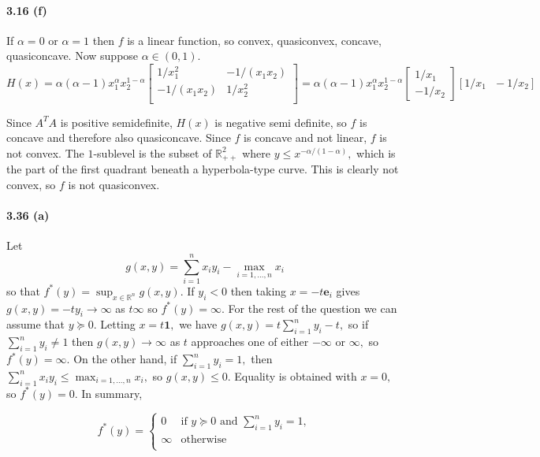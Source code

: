 \documentclass[a4paper,12pt]{article}
\newcommand{\e}{\mathbf{e}}
\begin{document}
\paragraph*{3.16 (f) }
If $\alpha = 0$ or $\alpha = 1$ then $f$ is a linear function, so convex, quasiconvex, concave, quasiconcave. 
\newline
Now suppose $\alpha \in (0,1).$
$$
H(x) = \alpha (\alpha-1) x_1^{\alpha} x_2^{1-\alpha}
\begin{bmatrix}
    1/x_1^2       & -1/(x_1 x_2) \\
    -1/(x_1 x_2)       & 1/x_2^2 \\
\end{bmatrix}
= \alpha (\alpha-1) x_1^{\alpha}  x_2^{1-\alpha}
\begin{bmatrix}1/x_1 \\-1/x_2\end{bmatrix} [ 1/x_1 \ \ \  -1/x_2 ]
$$

Since $A^TA$ is positive semidefinite, $H(x)$ is negative semi definite, so $f$ is concave and therefore also quasiconcave. Since $f$ is concave and not linear, $f$ is not convex. The $1$-sublevel is the subset of $\mathbb{R}^2_{++}$ where $ y \leq x^{-\alpha/(1-\alpha)},$ which is the part of the first quadrant beneath a hyperbola-type curve. This is clearly not convex, so $f$ is not quasiconvex. 

\paragraph*{3.36 (a)}
Let $$g(x,y) = \sum_{i=1}^n x_i y_i - \max_{i=1,\ldots, n} x_{i}$$ so that $f^*(y) = \sup_{x\in \mathbb{R}^n} g(x,y).$
\newline
If $y_i<0$ then taking $x = -t \e_i$ gives $g(x,y) = -t y_i \to\infty$ as $t\infty$ so $f^*(y) = \infty.$ 
\newline
For the rest of the question we can assume that $y \succeq 0.$ Letting $x = t \mathbf{1},$ we have $g(x,y) = t \sum_{i=1}^n y_i - t,$ so if $\sum_{i=1}^n y_i \neq 1$ then $g(x,y) \to \infty$ as $t$ approaches one of either $-\infty$ or $\infty,$ so $f^*(y)  = \infty.$
\newline
On the other hand, if $\sum_{i=1}^n y_i = 1,$ then $\sum_{i=1}^n x_i y_i \leq \max_{i=1,\ldots, n} x_i,$ so $g(x,y) \leq 0.$ Equality is obtained with $x=0,$ so $f^*(y) = 0.$ 
\newline
In summary,


\[
  f^*(y) =
  \begin{cases}
                                   0 & \text{if $y \succeq 0$ and $\sum_{i=1}^n y_i = 1,$} \\
                                   \infty & \text{otherwise} \\
  \end{cases}
\]
\end{document}
